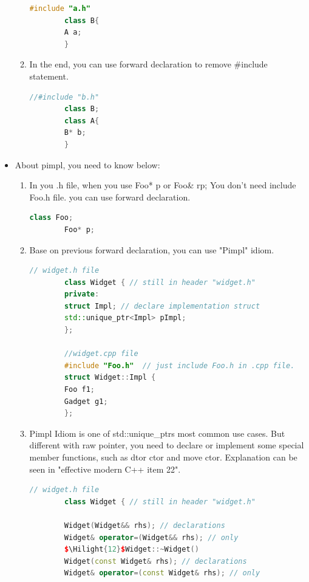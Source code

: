 \documentclass[a4paper,12pt,twoside]{book}
\newcommand{\Hilight}[1]{\makebox[0pt][l]{\color{yellow}\rule[-3pt]{#1em}{11pt}}}
\begin{document}
\begin{itemize}
\begin{enumerate}
\begin{lstlisting}[frame=single, language=c++]
        #include "a.h"
        class B{
        A a;
        }
        \end{lstlisting}
        \item In the end, you can use forward declaration to remove \#include statement. 
        \begin{lstlisting}[frame=single, language=c++]
        //#include "b.h"
        class B;
        class A{
        B* b;
        }
        \end{lstlisting}
    \end{enumerate}
    
    \item About pimpl, you need to know below:
    
    \begin{enumerate}
        
        \item In you .h file, when you use Foo* p or Foo\& rp; You don't need include Foo.h file. you can use forward declaration.
        \begin{lstlisting}[frame=single, language=c++]
        class Foo;
        Foo* p;
        \end{lstlisting}
        
        \item Base on previous forward declaration, you can use "Pimpl" idiom.
        \begin{lstlisting}[frame=single, language=c++]
        // widget.h file
        class Widget { // still in header "widget.h"
        private:
        struct Impl; // declare implementation struct
        std::unique_ptr<Impl> pImpl;
        };
        
        //widget.cpp file
        #include "Foo.h"  // just include Foo.h in .cpp file.
        struct Widget::Impl {
        Foo f1;
        Gadget g1;
        };
        \end{lstlisting}
        
        \item Pimpl Idiom is one of std::unique\_ptrs most common use cases. But different with raw pointer,  you need to declare or implement some special member functions, such as dtor ctor and move ctor. Explanation can be seen in "effective modern C++ item 22". 
        \begin{lstlisting}[frame=single, language=c++, mathescape=true]
        // widget.h file
        class Widget { // still in header "widget.h"
        
        Widget(Widget&& rhs); // declarations
        Widget& operator=(Widget&& rhs); // only
        $\Hilight{12}$Widget::~Widget()
        Widget(const Widget& rhs); // declarations
        Widget& operator=(const Widget& rhs); // only
        

\end{lstlisting}
\end{enumerate}
\end{itemize}
\end{document}

